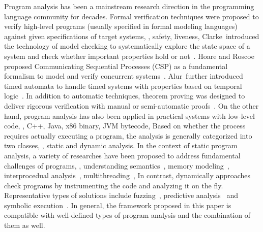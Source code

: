 Program analysis has been a mainstream research direction in the programming language 
community for decades. Formal verification techniques were proposed to verify high-level 
programs (usually specified in formal modeling languages) against given specifications 
of target systems, \eg, safety, liveness, \etc 
Clarke~\etal introduced the technology of model checking to systematically 
explore the state space of a system and check whether important properties hold or
not~\cite{clarke2009model}. Hoare and Roscoe proposed Communicating Sequential 
Processes (CSP) as a fundamental formalism to model and verify concurrent 
systems~\cite{hoare1978communicating,roscoe1998theory}. Alur~\etal further 
introduced timed automata to handle timed systems with properties based on 
temporal logic~\cite{alur1994theory}. In addition to automatic techniques, theorem proving 
was designed to deliver rigorous verification with manual or semi-automatic 
proofs~\cite{coquand1986calculus,nipkow2002isabelle}. On the other hand, program 
analysis has also been applied in practical systems with low-level code, \eg, C++, 
Java, x86 binary, JVM bytecode, \etc Based on whether the process requires actually 
executing a program, the analysis is generally categorized into two classes, \ie, static 
and dynamic analysis. In the context of static program analysis, a variety of researches 
have been proposed to address fundamental challenges of programs, \eg, understanding 
semantics~\cite{cousot1977abstract}, memory modeling~\cite{flanagan2002extended}, 
interprocedual analysis~\cite{reps1995precise,horwitz1990interprocedural}, 
multithreading~\cite{engler2003racerx}, \etc In contrast, dynamically approaches check 
programs by instrumenting the code and analyzing it on the fly. Representative types 
of solutions include fuzzing~\cite{rawat2017vuzzer,chen2018angora,godefroid2008grammar}, 
predictive analysis~\cite{flanagan2009fasttrack,bond2010pacer,burckhardt2010randomized} 
and symbolic execution~\cite{cadar2008klee,godefroid2012sage,chipounov2011s2e}. 
In general, the \tcpa framework proposed in this paper is compatible with well-defined 
types of program analysis and the combination of them as well.